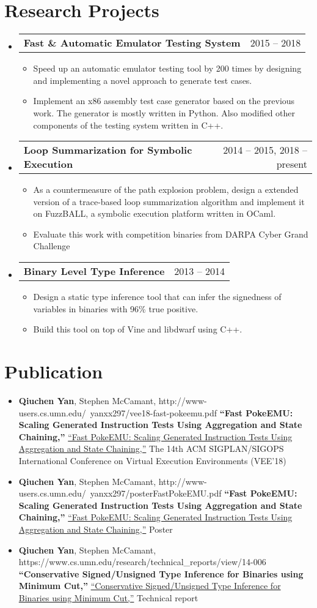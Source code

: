 \documentclass[letterpaper,11pt]{article}
\makeatletter
\newcommand{\myitem}[1]{
  \item[-]\small{
    { #1 \vspace{-2pt}}
  }
}
\newcommand{\project}[3]{
  \vspace{-1pt}\item[]
  \begin{tabular*}{0.97\textwidth}{l@{\extracolsep{\fill}}r}
  \textbf{\small#1} & {\small#2}\\
  \end{tabular*}
      {\small#3}\vspace{-5pt}
}
\newcommand{\bib}[4]{
  \vspace{-1pt}\item[]
      {\small#2},
      \ifx\hfuzz#4\hfuzz
      \textbf{\small``#1,''}      
      \else
      \href{#4}{\small``#1,''}
      \fi      
      \small{#3}
    \vspace{-2pt}
}
\newcommand{\content}{\begin{itemize}[leftmargin=0px]}
\newcommand{\contentend}{\end{itemize}}
\newcommand{\mylist}{\begin{itemize}[leftmargin=25px,rightmargin=25px]}
\newcommand{\mylistend}{\end{itemize}\vspace{-5pt}}
\makeatother
\begin{document}
\section{Research Projects}
  \content  	
    \project
      {Fast \& Automatic Emulator Testing System}{2015 -- 2018}{}
    \mylist
        \myitem
          {Speed up an automatic emulator testing tool by 200 times by designing and
          implementing a novel approach to generate test cases.}
        \myitem{
          Implement an x86 assembly test case generator based on the previous work.
          The generator is mostly written in Python.
          Also modified other components of the testing system written in C++.
        }
      \mylistend         
    \project
      {Loop Summarization for Symbolic Execution}{2014 -- 2015, 2018 -- present}{}  
      \mylist
        \myitem{
          As a countermeasure of the path explosion problem, 
          design a extended version of a trace-based loop summarization algorithm\cite{Godefroid2011}
          and implement it on FuzzBALL, a symbolic execution platform written in OCaml.
        }   
        \myitem{
          Evaluate this work with competition
          binaries from DARPA Cyber Grand Challenge
        }
      \mylistend          
    \project
      {Binary Level Type Inference}{2013 -- 2014}{}
      \mylist
        \myitem
          {Design a static type inference tool that can infer 
          the signedness of variables in binaries with 96\% true positive.}        
        \myitem{
          Build this tool on top of Vine and libdwarf using C++.
        }
      \mylistend       
  \contentend

%
\section{Publication}
	\content
    \bib
      {Fast PokeEMU: Scaling Generated Instruction Tests Using 
      Aggregation and State Chaining}
      {\textbf{Qiuchen Yan}, Stephen McCamant}
      {The 14th ACM SIGPLAN/SIGOPS International Conference on Virtual Execution Environments (VEE'18)}
      {http://www-users.cs.umn.edu/~yanxx297/vee18-fast-pokeemu.pdf}
    \bib
      {Fast PokeEMU: Scaling Generated Instruction Tests Using 
      Aggregation and State Chaining}
      {\textbf{Qiuchen Yan}, Stephen McCamant}
      {Poster}
      {http://www-users.cs.umn.edu/~yanxx297/posterFastPokeEMU.pdf}     
    \bib
      {Conservative Signed/Unsigned Type Inference for Binaries
      using Minimum Cut}
      {\textbf{Qiuchen Yan}, Stephen McCamant}
      {Technical report}
      {https://www.cs.umn.edu/research/technical_reports/view/14-006}             
  \contentend         
\end{document}
